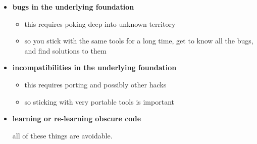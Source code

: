 \begin{itemize}
\item {\bf 	bugs in the underlying foundation}

	\begin{itemize}
	\item this requires poking deep into unknown territory
	\item so you stick with the same tools for a long time, get to know all
		the bugs, and find solutions to them
	\end{itemize}

\item {\bf 	incompatibilities in the underlying foundation}

	\begin{itemize}
	\item this requires porting and possibly other hacks
	\item so sticking with very portable tools is important
	\end{itemize}

\item {\bf  learning or re-learning obscure code}
	
	all of these things are avoidable.

\end{itemize}

\pagebreak
